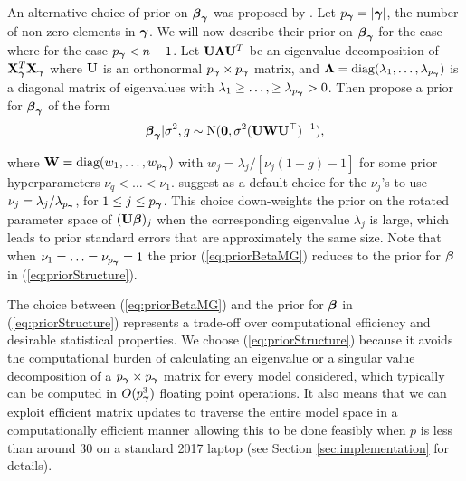 An alternative choice of prior on ${\boldsymbol \beta}_{\boldsymbol \gamma}$ was proposed by
\cite{Maruyama2011}. Let $p_{{\boldsymbol \gamma}} = |{\boldsymbol \gamma}|$, the number of non-zero
elements in ${\boldsymbol \gamma}$. We will now describe their prior on ${\boldsymbol \beta}_{\boldsymbol \gamma}$ for
the case where for the case $p_{{\boldsymbol \gamma}} < n - 1$. Let ${\bf U}{\boldsymbol \Lambda}{\bf U}^T$ be an
eigenvalue decomposition of ${\bf X}_{\boldsymbol \gamma}^T{\bf X}_{\boldsymbol \gamma}$ where ${\bf U}$ is an
orthonormal $p_{{\boldsymbol \gamma}} \times p_{{\boldsymbol \gamma}}$ matrix, and ${\boldsymbol \Lambda} =
\mbox{diag}(\lambda_1,\ldots,\lambda_{p_{{\boldsymbol \gamma}}})$ is a diagonal matrix of
eigenvalues with $\lambda_1\ge\ldots,\ge \lambda_{p_{{\boldsymbol \gamma}}}>0$. Then
\cite{Maruyama2011} propose a prior for ${\boldsymbol \beta}_{\boldsymbol \gamma}$ of the form
\begin{equation} \label{eq:priorBetaMG} {\boldsymbol\beta}_{\boldsymbol \gamma} | \sigma^2, g \sim
\text{N}({\bf 0}, \sigma^2 ({\bf U}{\bf W}{\bf U}^\top)^{-1}),   \end{equation} 

\noindent where ${\bf W} = \mbox{diag}(w_1,\ldots,w_{p_{{\boldsymbol \gamma}}})$ with $ w_j =
\lambda_j/[\nu_j(1 + g) - 1]$ for some prior hyperparameters $\nu_q < \ldots <
\nu_1$. \cite{Maruyama2011} suggest as a default choice for the $\nu_j$'s to
use $\nu_j = \lambda_j/\lambda_{p_{{\boldsymbol \gamma}}}$, for $1\le j \le p_{{\boldsymbol \gamma}}$.
This choice down-weights the prior on the rotated parameter space of $({\bf U}
{\boldsymbol \beta})_j$ when the corresponding eigenvalue $\lambda_j$ is large, which leads
to prior standard errors that are approximately the same size. Note that when
$\nu_1 = \ldots = \nu_{p_{{\boldsymbol \gamma}}} = 1$ the prior (\ref{eq:priorBetaMG})
reduces to the prior for ${\boldsymbol \beta}$ in (\ref{eq:priorStructure}). 

The choice between (\ref{eq:priorBetaMG}) and the prior for ${\boldsymbol \beta}$ in
(\ref{eq:priorStructure}) represents a trade-off over computational efficiency
and desirable statistical properties. We choose (\ref{eq:priorStructure})
because it avoids the computational burden of calculating an eigenvalue or a
singular value decomposition of a $p_{{\boldsymbol \gamma}}\times p_{{\boldsymbol \gamma}}$ matrix for
every model considered, which typically can be computed in $O(p_{{\boldsymbol \gamma}}^3)$
floating point operations.  It also means that we can exploit efficient matrix
updates to traverse the entire model space in a computationally efficient
manner allowing this to be done feasibly when $p$ is less than around 30 on a
standard 2017 laptop (see Section \ref{sec:implementation} for details).


